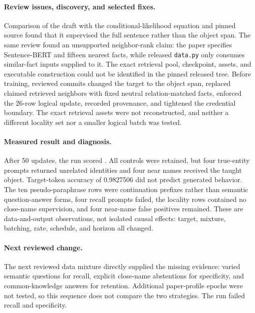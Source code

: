 \paragraph{Review issues, discovery, and selected fixes.}
Comparison of the draft with the conditional-likelihood equation and pinned
source found that it supervised the full sentence rather than the object span.
The same review found an unsupported neighbor-rank claim: the paper specifies
Sentence-BERT and fifteen nearest facts, while released \texttt{data.py} only
consumes similar-fact inputs supplied to it. The exact retrieval pool,
checkpoint, assets, and executable construction could not be identified in the
pinned released tree. Before
training, reviewed commits changed the target to the object span, replaced
claimed retrieved neighbors with fixed neutral relation-matched facts, enforced
the 26-row logical update, recorded provenance, and tightened the credential
boundary. The exact retrieval assets were not reconstructed, and neither a
different locality set nor a smaller logical batch was tested.
\citep{gangadhar2024model,gangadhar2024data,gangadhar2024code}

\paragraph{Measured result and diagnosis.}
After 50 updates, the run scored . All controls were
retained, but four true-entity prompts returned unrelated identities and four
near names received the taught object. Target-token accuracy of 0.9827506 did
not predict generated behavior. The ten pseudo-paraphrase rows were
continuation prefixes rather than semantic question-answer forms, four recall
prompts failed, the locality rows contained no close-name supervision, and four
near-name false positives remained. These are data-and-output observations,
not isolated causal effects: target, mixture, batching, rate, schedule, and
horizon all changed. 

\paragraph{Next reviewed change.}
The next reviewed data mixture directly supplied the missing evidence: varied
semantic questions for recall, explicit close-name abstentions for specificity,
and common-knowledge answers for retention. Additional paper-profile epochs
were not tested, so this sequence does not compare the two strategies. The run
failed recall and specificity.

